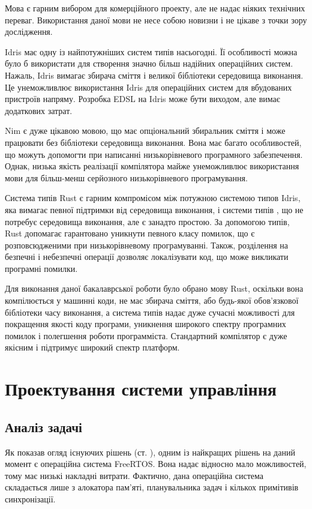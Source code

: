 \documentclass[oneside,14pt,a4paper,final]{myextreport}
\begin{document}
Мова \LangC{} є гарним вибором для комерційного проекту, але не надає ніяких технічних переваг. Використання даної мови не несе собою новизни і не цікаве з точки зору дослідження.

Idris має одну із найпотужніших систем типів насьогодні. Її особливості можна було б використати для створення значно більш надійних операційних систем. Нажаль, Idris вимагає збирача сміття і великої бібліотеки середовища виконання. Це унеможливлює використання Idris для операційних систем для вбудованих пристроїв напряму. Розробка EDSL на Idris може бути виходом, але вимає додаткових затрат.

Nim є дуже цікавою мовою, що має опціональний збиральник сміття і може працювати без бібліотеки середовища виконання. Вона має багато особливостей, що можуть допомогти при написанні низькорівневого програмного забезпечення. Однак, низька якість реалізації компілятора майже унеможливлює використання мови для більш-менш серйозного низькорівневого програмування.

Система типів Rust є гарним компромісом між потужною системою типов Idris, яка вимагає певної підтримки від середовища виконання, і системи типів \LangC{}, що не потребує середовища виконання, але є занадто простою. За допомогою типів, Rust допомагає гарантовано уникнути певного класу помилок, що є розповсюдженими при низькорівневому програмуванні. Також, розділення на безпечні і небезпечні операції дозволяє локалізувати код, що може викликати програмні помилки.

Для виконання даної бакалаврської роботи було обрано мову Rust, оскільки вона компілюється у машинні коди, не має збирача сміття, або будь-якої обов'язкової бібліотеки часу виконання, а система типів надає дуже сучасні можливості для покращення якості коду програми, уникнення широкого спектру програмних помилок і полегшення роботи программіста. Стандартний компілятор є дуже якісним і підтримує широкий спектр платформ.

\chapter{Проектування системи управління}
\section{Аналіз задачі}

Як показав огляд існуючих рішень (ст. \pageref{existing-solutions}), одним із найкращих рішень на даний момент є операційна система FreeRTOS. Вона надає відносно мало можливостей, тому має низькі накладні витрати. Фактично, дана операційна система складається лише з алокатора пам'яті, планувальника задач і кількох примітивів синхронізації.
\end{document}
